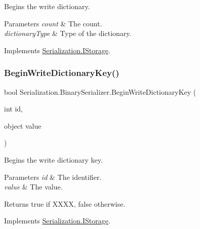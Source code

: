 Begins the write dictionary. 


\begin{DoxyParams}{Parameters}
{\em count} & The count.\\
\hline
{\em dictionary\+Type} & Type of the dictionary.\\
\hline
\end{DoxyParams}


Implements \hyperlink{interface_serialization_1_1_i_storage_ac8185d715cc5318790a408427e5bc113}{Serialization.\+I\+Storage}.

\mbox{\label{class_serialization_1_1_binary_serializer_a07ccc4cc72e4c414f60de04ace5a6459}} 
\subsubsection{\texorpdfstring{Begin\+Write\+Dictionary\+Key()}{BeginWriteDictionaryKey()}}
{\footnotesize\ttfamily bool Serialization.\+Binary\+Serializer.\+Begin\+Write\+Dictionary\+Key (\begin{DoxyParamCaption}\item[{int}]{id,  }\item[{object}]{value }\end{DoxyParamCaption})\hspace{0.3cm}{\ttfamily [inline]}}



Begins the write dictionary key. 


\begin{DoxyParams}{Parameters}
{\em id} & The identifier.\\
\hline
{\em value} & The value.\\
\hline
\end{DoxyParams}
\begin{DoxyReturn}{Returns}
{\ttfamily true} if X\+X\+XX, {\ttfamily false} otherwise.
\end{DoxyReturn}


Implements \hyperlink{interface_serialization_1_1_i_storage_a73c60fce612a22b4832223b245688384}{Serialization.\+I\+Storage}.

\mbox{\label{class_serialization_1_1_binary_serializer_afb882e22e8a0215c525810ea8c2375d8}} 
